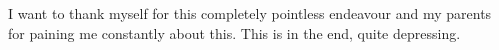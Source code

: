 I want to thank myself for this completely pointless endeavour and my parents for paining me constantly about this. This is in the end, quite depressing.